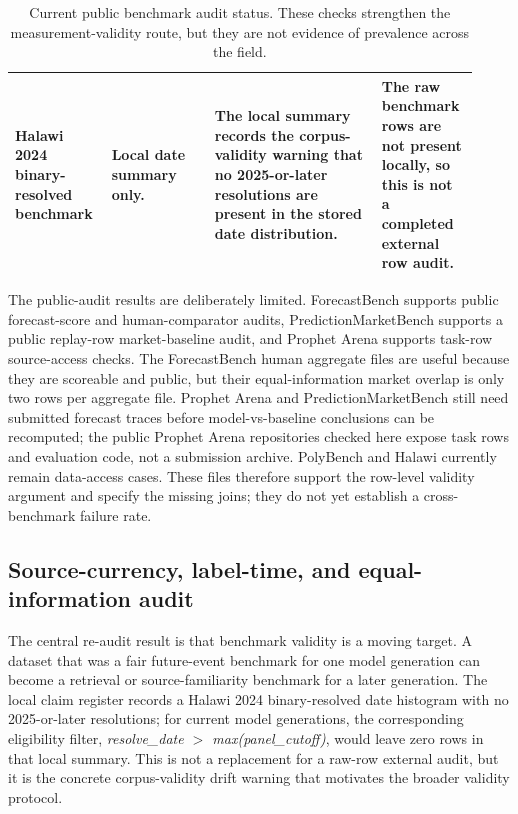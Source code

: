 \documentclass[11pt]{article}
\begin{document}
\begin{table}[htbp]
\begin{tabular}{@{}L{0.18\linewidth} L{0.21\linewidth} L{0.34\linewidth} L{0.19\linewidth}@{}}
Halawi 2024 binary-resolved benchmark & Local date summary only. & The local summary records the corpus-validity warning that no 2025-or-later resolutions are present in the stored date distribution. & The raw benchmark rows are not present locally, so this is not a completed external row audit. \\
\bottomrule
\end{tabular}
\caption{Current public benchmark audit status. These checks strengthen the measurement-validity route, but they are not evidence of prevalence across the field.}
\label{tab:public-benchmark-audit}
\end{table}

The public-audit results are deliberately limited. ForecastBench supports public forecast-score and human-comparator audits, PredictionMarketBench supports a public replay-row market-baseline audit, and Prophet Arena supports task-row source-access checks. The ForecastBench human aggregate files are useful because they are scoreable and public, but their equal-information market overlap is only two rows per aggregate file. Prophet Arena and PredictionMarketBench still need submitted forecast traces before model-vs-baseline conclusions can be recomputed; the public Prophet Arena repositories checked here expose task rows and evaluation code, not a submission archive. PolyBench and Halawi currently remain data-access cases. These files therefore support the row-level validity argument and specify the missing joins; they do not yet establish a cross-benchmark failure rate.

\subsection{Source-currency, label-time, and equal-information audit}

The central re-audit result is that benchmark validity is a moving target. A dataset that was a fair future-event benchmark for one model generation can become a retrieval or source-familiarity benchmark for a later generation. The local claim register records a Halawi 2024 binary-resolved date histogram with no 2025-or-later resolutions; for current model generations, the corresponding eligibility filter, \emph{resolve\_date $>$ max(panel\_cutoff)}, would leave zero rows in that local summary. This is not a replacement for a raw-row external audit, but it is the concrete corpus-validity drift warning that motivates the broader validity protocol.
\end{document}
